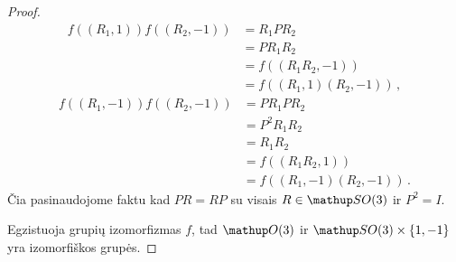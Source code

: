 \begin{proof}
\begin{equation}
	\end{equation}
	\begin{equation}
		\begin{split}
			f((R_1,1))f((R_2,-1))
			&= R_1 P R_2 \\
			&= P R_1 R_2 \\
			&= f((R_1 R_2,-1)) \\
			&= f((R_1,1)(R_2,-1)) \,,
		\end{split}
	\end{equation}
	\begin{equation}
		\begin{split}
			f((R_1,-1))f((R_2,-1))
			&= P R_1 P R_2 \\
			&= P^2 R_1 R_2 \\
			&= R_1 R_2 \\
			&= f((R_1 R_2,1)) \\
			&= f((R_1,-1)(R_2,-1)) \,.
		\end{split}
	\end{equation}
	Čia pasinaudojome faktu kad $PR=RP$ su visais 
	$R \in \SO3$ ir $P^2=I$. 
	
	Egzistuoja grupių izomorfizmas $f$,
	tad $\Orth3$ ir $\SO3 \times \qty{1,-1}$
	yra izomorfiškos grupės.
\end{proof}




